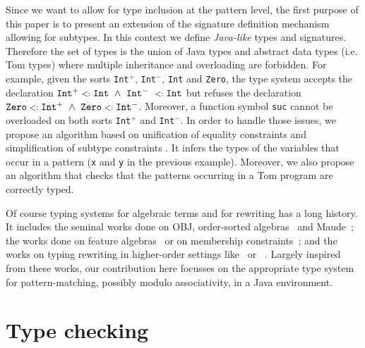 \documentclass{eptcs}
\newcommand{\tom}{\textsf{Tom}\xspace}
\newcommand{\Java}{\textsf{Java}\xspace}
\newcommand{\java}{\Java}
\newcommand{\sub}{\mathrel{\mbox{{\footnotesize $<:$}}}}
\begin{document}
Since we want to allow for type inclusion at the pattern level, the first purpose of this
paper is to present an extension of the signature definition mechanism allowing for
subtypes. In this context we define \textit{\java-like} types and signatures.
Therefore the set of types is the union of \java types and
abstract data types (i.e. \tom types) where multiple inheritance and
overloading are forbidden. For example, given the sorts \texttt{Int}$^+$,
\texttt{Int}$^-$, \texttt{Int} and \texttt{Zero}, the type system accepts the
declaration 
$\texttt{Int}^+ \sub \texttt{Int} ~\wedge~ \texttt{Int}^-  ~\sub \texttt{Int} $
but refuses the declaration 
$\texttt{Zero} \sub \texttt{Int}^+ ~\wedge~ \texttt{Zero} \sub \texttt{Int}^-$.
Moreover, a function symbol \texttt{suc} cannot be overloaded on
both sorts \texttt{Int}$^+$ and \texttt{Int}$^-$. In order to handle those
issues, we propose an algorithm based on unification of equality
constraints \cite{milner:78} and simplification of subtype constraints
\cite{dominic:01,aiken:92,pottier:01}. It infers the types of the variables that occur
in a pattern (\texttt{x} and \texttt{y} in the previous example). Moreover, we
also propose an algorithm
that checks that the patterns occurring in a {\tom} program are correctly typed.

Of course typing systems for algebraic terms and for rewriting has a long history.  It
includes the seminal works done on OBJ, order-sorted algebras~\cite{obj3-88,OBJ2-POPL}
and Maude~\cite{Maude2007}; the works done on feature
algebras~\cite{AitKaciPodelskiSmolkaTCS94} or on membership
constraints~\cite{HintermeierKK-jsc98,DBLP:journals/jsc/Comon98}; and the works on typing
rewriting in higher-order settings like~\cite{BakelF97} or ~\cite{barthe03a}.  Largely
inspired from these works, our contribution here focusses on the appropriate type system
for pattern-matching, possibly modulo associativity, in a \java environment.



\section{Type checking}
\label{sec:checking}
\end{document}
